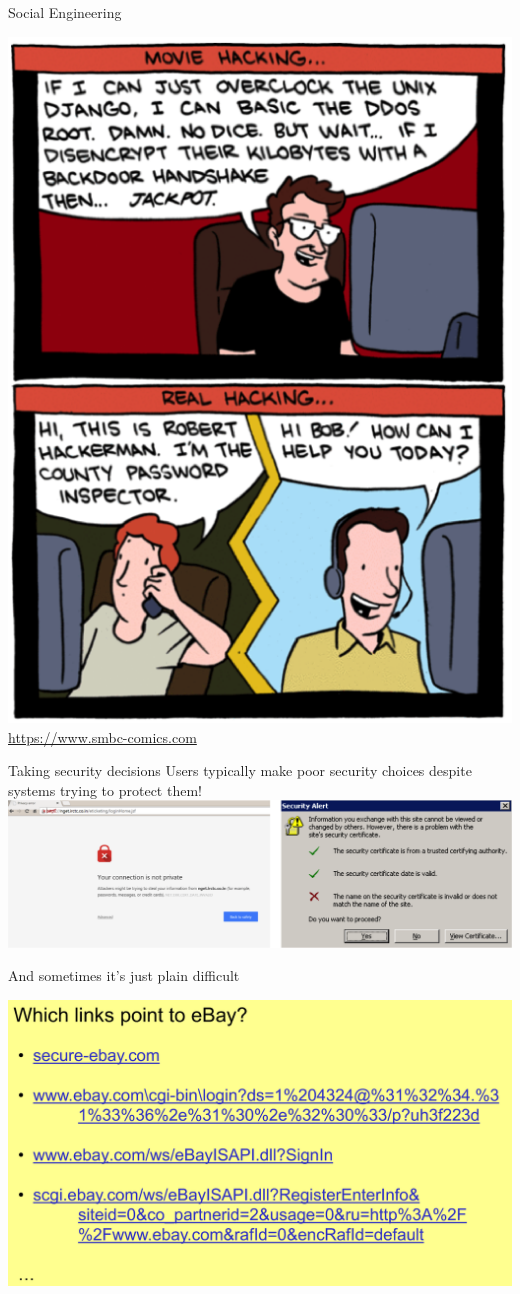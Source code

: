 \documentclass{beamer}
\begin{document}
\begin{frame}{Social Engineering}
\begin{center}
\includegraphics[width=0.4\linewidth]{socialengineering.png}\newline
{\small \url{https://www.smbc-comics.com}}
\end{center}
\end{frame}

\begin{frame}{Taking security decisions}
Users typically make poor security choices despite systems trying to protect them!
\includegraphics[width=1\linewidth]{security-decisions.png}
\end{frame}

\begin{frame}{And sometimes it's just plain difficult}
\begin{center}
\includegraphics[width=0.9\linewidth]{ebay.png}
\end{center}
\end{frame}
\end{document}
